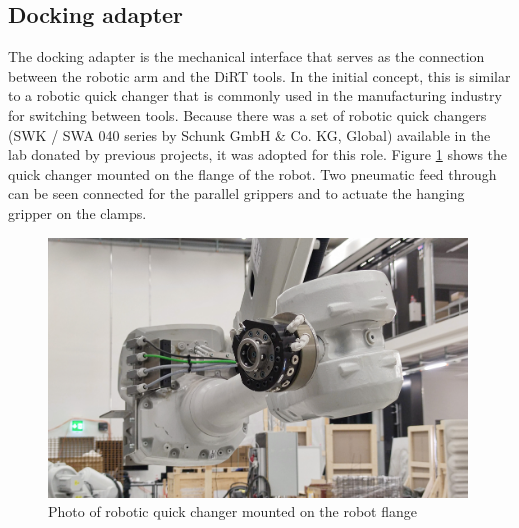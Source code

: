 \subsection{Docking adapter}
\label{subsection:exploration-2-docking-adapter}

The docking adapter is the mechanical interface that serves as the connection between the robotic arm and the DiRT tools. In the initial concept, this is similar to a robotic quick changer that is commonly used in the manufacturing industry for switching between tools. Because there was a set of robotic quick changers (SWK / SWA 040 series by Schunk GmbH \& Co. KG, Global) available in the lab donated by previous projects, it was adopted for this role. Figure \ref{fig:quick-changer} shows the quick changer mounted on the flange of the robot. Two pneumatic feed through can be seen connected for the parallel grippers  and to actuate the hanging gripper on the clamps.


\begin{figure}
    \centering
    \includegraphics[width=0.99\textwidth]{images/05/image20.jpg}
    \caption{Photo of robotic quick changer mounted on the robot flange}
    \label{fig:quick-changer}
\end{figure}


